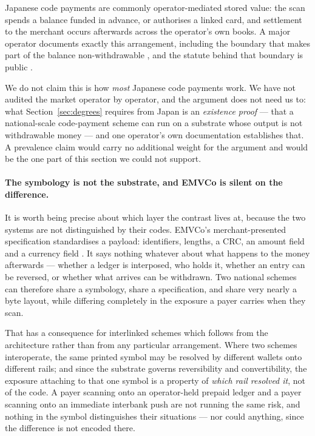 \documentclass[10pt,a4paper,twocolumn]{article}
\begin{document}
Japanese code payments are commonly operator-mediated stored value: the scan
spends a balance funded in advance, or authorises a linked card, and settlement
to the merchant occurs afterwards across the operator's own books. A major
operator documents exactly this arrangement, including the boundary that makes
part of the balance non-withdrawable \citep{paypaybalance}, and the statute
behind that boundary is public \citep{jpsa}.

We do not claim this is how \emph{most} Japanese code payments work. We have not
audited the market operator by operator, and the argument does not need us to:
what Section~\ref{sec:degrees} requires from Japan is an \emph{existence proof}
--- that a national-scale code-payment scheme can run on a substrate whose
output is not withdrawable money --- and one operator's own documentation
establishes that. A prevalence claim would carry no additional weight for the
argument and would be the one part of this section we could not support.

\paragraph{The symbology is not the substrate, and EMVCo is silent on the
difference.} It is worth being precise about which layer the contrast lives at,
because the two systems are not distinguished by their codes. EMVCo's
merchant-presented specification standardises a payload: identifiers, lengths, a
CRC, an amount field and a currency field \citep{emvco2017mpm}. It says nothing
whatever about what happens to the money afterwards --- whether a ledger is
interposed, who holds it, whether an entry can be reversed, or whether what
arrives can be withdrawn. Two national schemes can therefore share a symbology,
share a specification, and share very nearly a byte layout, while differing
completely in the exposure a payer carries when they scan.

That has a consequence for interlinked schemes which follows from the
architecture rather than from any particular arrangement. Where two schemes
interoperate, the same printed symbol may be resolved by different wallets onto
different rails; and since the substrate governs reversibility and
convertibility, the exposure attaching to that one symbol is a property of
\emph{which rail resolved it}, not of the code. A payer scanning onto an
operator-held prepaid ledger and a payer scanning onto an immediate interbank
push are not running the same risk, and nothing in the symbol distinguishes
their situations --- nor could anything, since the difference is not encoded
there.
\end{document}
